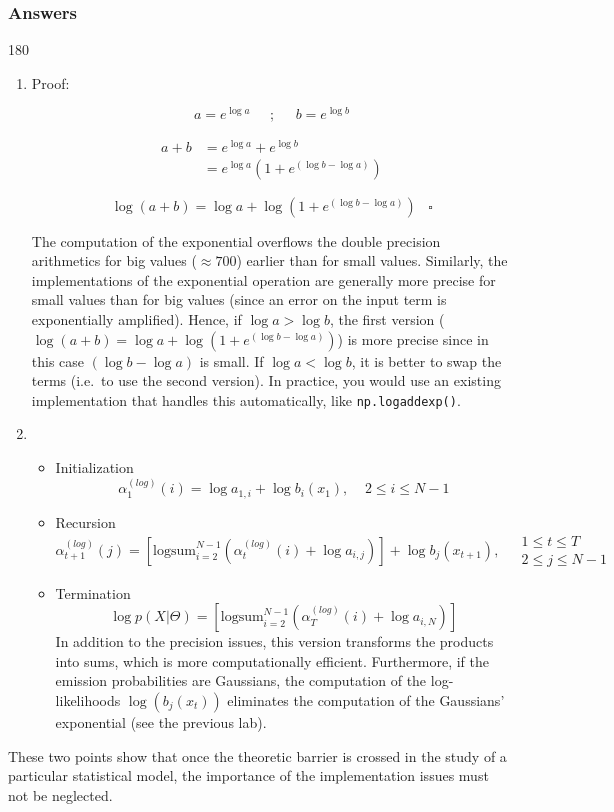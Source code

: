 \documentclass[11pt]{article}
\newenvironment{answer}{\begin{turn}{180}\begin{minipage}[t]{\linewidth}\begin{itshape}}{\end{itshape}\end{minipage}\end{turn}}
\begin{document}
\subsubsection{Answers}
\label{sec:org64a2f4e}
\begin{answer}
\begin{enumerate}
\item Proof:

$$
   a = e^{\log a} \;\;\;\;\;;\;\;\;\;\; b = e^{\log b}
   $$

\begin{align*}
a+b &= e^{\log a} + e^{\log b} \\
    &= e^{\log a} \left( 1 + e^{(\log b - \log a)} \right)
\end{align*}

$$
   \log(a+b) = \log a + \log \left( 1 + e^{(\log b - \log a)} \right) \;\;\; \square
   $$

The computation of the exponential overflows the double precision
arithmetics for big values (\(\approx700\)) earlier than for small
values. Similarly, the implementations of the exponential operation
are generally more precise for small values than for big values
(since an error on the input term is exponentially amplified). Hence,
if \(\log a > \log b\), the first version
(\(\log(a+b) = \log a + \log \left( 1 + e^{(\log b - \log a)} \right)\))
is more precise since in this case \((\log b - \log a)\) is small. If
\(\log a < \log b\), it is better to swap the terms (i.e. to use the
second version). In practice, you would use an existing
implementation that handles this automatically, like
\texttt{np.logaddexp()}.

\item \begin{itemize}
\item Initialization
$$
       \alpha_1^{(log)}(i) = \log a_{1,i} + \log b_i(x_1), \;\;\;\; 2 \leq i \leq N-1
     $$
\item Recursion
$$
       \alpha_{t+1}^{(log)}(j) = \left[ \mbox{logsum}_{i=2}^{N-1} \left(
                           \alpha_{t}^{(log)}(i) + \log a_{i,j}
                       \right) \right] + \log b_j(x_{t+1}),
       \;\;\;\; \begin{array}{l} 1 \leq t \leq T \\ 2 \leq j \leq N-1 \end{array}
     $$
\item Termination
$$
       \log p(X|\Theta) = \left[ \mbox{logsum}_{i=2}^{N-1} \left(
           \alpha_{T}^{(log)}(i) + \log a_{i,N} \right) \right]
     $$
In addition to the precision issues, this version transforms the
products into sums, which is more computationally efficient.
Furthermore, if the emission probabilities are Gaussians, the
computation of the log-likelihoods \(\log(b_j(x_t))\) eliminates the
computation of the Gaussians' exponential (see the previous lab).
\end{itemize}
\end{enumerate}

These two points show that once the theoretic barrier is crossed in the
study of a particular statistical model, the importance of the
implementation issues must not be neglected.
\end{answer}
\end{document}

